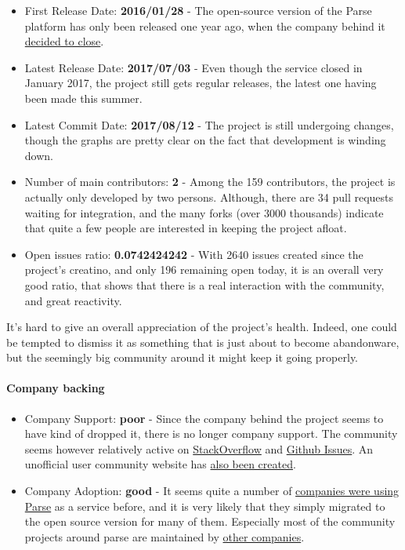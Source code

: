 \documentclass{article}
\begin{document}
\begin{itemize}
\item First Release Date: \textbf{2016/01/28} - The open-source version of the Parse platform has only been released one year ago, when the company behind it \href{http://blog.parse.com/announcements/moving-on/}{decided to close}.
\item Latest Release Date: \textbf{2017/07/03} - Even though the service closed in January 2017, the project still gets regular releases, the latest one having been made this summer.
\item Latest Commit Date: \textbf{2017/08/12} - The project is still undergoing changes, though the graphs are pretty clear on the fact that development is winding down.
\item Number of main contributors: \textbf{2} - Among the 159 contributors, the project is actually only developed by two persons. Although, there are 34 pull requests waiting for integration, and the many forks (over 3000 thousands) indicate that quite a few people are interested in keeping the project afloat.
\item Open issues ratio: \textbf{0.0742424242} - With 2640 issues created since the project's creatino, and only 196 remaining open today, it is an overall very good ratio, that shows that there is a real interaction with the community, and great reactivity.
\end{itemize}

It's hard to give an overall appreciation of the project's health. Indeed, one could be tempted to dismiss it as something that is just about to become abandonware, but the seemingly big community around it might keep it going properly.

\paragraph{Company backing}

\begin{itemize}
\item Company Support: \textbf{poor} - Since the company behind the project seems to have kind of dropped it, there is no longer company support. The community seems however relatively active on \href{https://stackoverflow.com/tags/parse.com}{StackOverflow} and \href{https://github.com/parse-community/parse-server/issues}{Github Issues}. An unofficial user community website has \href{http://parseopensource.github.io/}{also been created}.
\item Company Adoption: \textbf{good} - It seems quite a number of \href{https://www.quora.com/What-apps-are-built-on-Parse}{companies were using Parse} as a service before, and it is very likely that they simply migrated to the open source version for many of them. Especially most of the community projects around parse are maintained by \href{https://github.com/modernistik}{other companies}.
\end{itemize}
\end{document}
